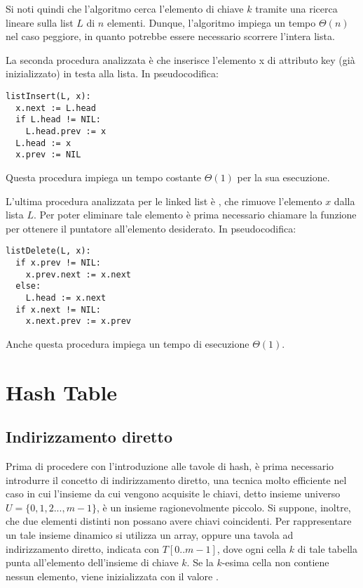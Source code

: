 Si noti quindi che l'algoritmo  cerca l'elemento di chiave \(k\) tramite una ricerca lineare sulla list \(L\) di \(n\) elementi. Dunque, l'algoritmo impiega un tempo \(\Theta(n)\) nel caso peggiore, in quanto potrebbe essere necessario scorrere l'intera lista.

\vspace{10pt}

La seconda procedura analizzata è  che inserisce l'elemento x di attributo key (già inizializzato) in testa alla lista. In pseudocodifica:

\begin{lstlisting}
listInsert(L, x):
  x.next := L.head
  if L.head != NIL:
    L.head.prev := x
  L.head := x
  x.prev := NIL 
\end{lstlisting}

Questa procedura impiega un tempo costante \(\Theta(1)\) per la sua esecuzione.

\vspace{10pt}

L'ultima procedura analizzata per le linked list è , che rimuove l'elemento \(x\) dalla lista \(L\). Per poter eliminare tale elemento è prima necessario chiamare la funzione  per ottenere il puntatore all'elemento desiderato. In pseudocodifica:

\begin{lstlisting}
listDelete(L, x):
  if x.prev != NIL:
    x.prev.next := x.next
  else:
    L.head := x.next
  if x.next != NIL:
    x.next.prev := x.prev
\end{lstlisting}

Anche questa procedura impiega un tempo di esecuzione \(\Theta(1)\).

\section{Hash Table}
\subsection{Indirizzamento diretto}
Prima di procedere con l'introduzione alle tavole di hash, è prima necessario introdurre il concetto di indirizzamento diretto, una tecnica molto efficiente nel caso in cui l'insieme da cui vengono acquisite le chiavi, detto insieme universo \(U = \{0,1,2...,m-1\}\), è un insieme ragionevolmente piccolo. Si suppone, inoltre, che due elementi distinti non possano avere chiavi coincidenti. Per rappresentare un tale insieme dinamico si utilizza un array, oppure una tavola ad indirizzamento diretto, indicata con \(T[0..m-1]\), dove ogni cella \(k\) di tale tabella punta all'elemento dell'insieme di chiave \(k\). Se la \(k\)-esima cella non contiene nessun elemento, viene inizializzata con il valore .


